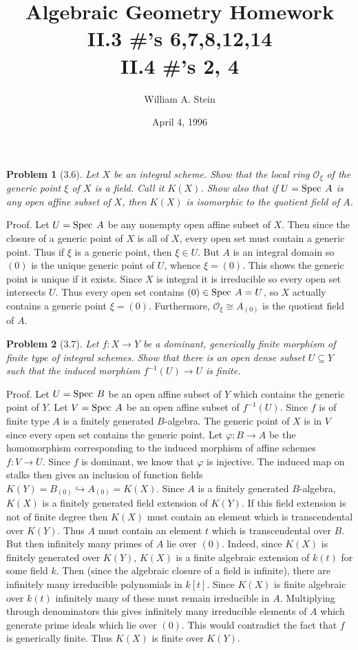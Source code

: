 \documentclass[12pt]{article}
\author{William A. Stein}
\title{Algebraic Geometry Homework\\
II.3 \#'s 6,7,8,12,14\\ II.4 \#'s 2, 4}
\date{April 4, 1996}
\newcommand{\so}{\mathcal{O}}
\newtheorem{prob}{Problem}
\renewcommand{\phi}{\varphi}
\newcommand{\spec}{\mbox{\rm Spec \hspace{.01in}}}
\newcommand{\proof}{\mbox{\sc Proof.\hspace{.1in}}}
\begin{document}
\maketitle

\begin{prob}[3.6]
Let $X$ be an integral scheme. Show that the local ring $\so_{\xi}$ of
the generic point $\xi$ of $X$ is a field. Call it $K(X)$. Show also 
that if $U=\spec A$ is any open affine subset of $X$, then $K(X)$ is
isomorphic to the quotient field of $A$.  
\end{prob}
\proof
Let $U=\spec A$ be any nonempty open affine subset of $X$. Then since
the closure of a generic point of $X$ is all of $X$, every open set
must contain a generic point. Thus if $\xi$ is a generic point, then 
$\xi\in U$. But $A$ is an integral domain so $(0)$ is the unique 
generic point of $U$, whence $\xi=(0)$. This shows the generic point is
unique if it exists. Since $X$ is integral it is irreducible so every
open set intersects $U$. Thus every open set contains $(0)\in \spec A=U$, 
so $X$ actually contains a generic point $\xi=(0)$. Furthermore,
$\so_{\xi}\cong A_{(0)}$ is the quotient field of $A$. 

\begin{prob}[3.7]
Let $f:X\rightarrow Y$ be a dominant, generically finite morphism of 
finite type of integral schemes. Show that there is an open dense
subset $U\subseteq Y$ such that the induced morphism 
$f^{-1}(U)\rightarrow U$ is finite. 
\end{prob}
\proof
Let $U=\spec B$ be an open affine subset of $Y$ which contains the
generic point of $Y$. Let $V=\spec A$ be an open affine subset of
$f^{-1}(U)$. Since $f$ is of finite type $A$ is a finitely generated
$B$-algebra. The generic point of $X$ is in $V$ since every
open set contains the generic point. Let $\phi:B\rightarrow A$ be
the homomorphism corresponding to the induced morphism of affine schemes
$f:V\rightarrow U$.
Since $f$ is dominant, we know that $\phi$ is injective. 
The induced map on stalks then gives an inclusion
of function fields $K(Y)=B_{(0)}\hookrightarrow A_{(0)}=K(X)$. 
Since $A$ is a finitely generated $B$-algebra, $K(X)$ is a finitely
generated field extension of $K(Y)$. If this field extension is not of 
finite degree then $K(X)$ must contain an element which is
transcendental over $K(Y)$. Thus $A$ must contain an
element $t$ which is transcendental over $B$. But then infinitely
many primes of $A$ lie over $(0)$. Indeed, since $K(X)$ is
finitely generated over $K(Y)$, $K(X)$ is
a finite algebraic extension of $k(t)$ for some field $k$.
Then (since the algebraic closure of a field is
infinite), there are infinitely many irreducible polynomials
in $k[t]$. Since $K(X)$ is finite algebraic over $k(t)$ 
infinitely many of these must remain irreducible in $A$.  
Multiplying through denominators this gives infinitely
many irreducible elements of $A$ which generate prime ideals
which lie over $(0)$. This would contradict the fact that
$f$ is generically finite. Thus $K(X)$ is finite over $K(Y)$.  
\end{document}

